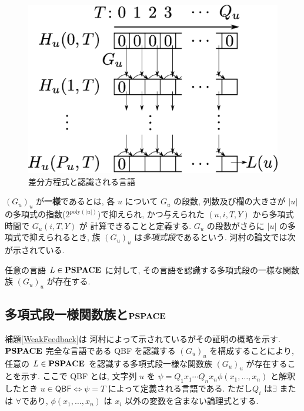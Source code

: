  \begin{figure}
  \label{fig:divp}
  \begin{center}
   \includegraphics[height=0.2\textheight]{image/divp.eps}
  \end{center}
  \caption{差分方程式と認識される言語}
 \end{figure}

$(G_u)_u$ が{\bf 一様}であるとは,
各 $u$ について $G _u$ の段数, 列数及び欄の大きさが $|u|$ の多項式の指数($2^{\mathrm{poly} (|u|)}$)で抑えられ, 
かつ与えられた $(u, i, T, Y)$ から多項式時間で $G_u(i, T, Y)$ が
計算できることと定義する.
$G_u$ の段数がさらに $|u|$ の多項式で抑えられるとき, 
族 $(G_u) _u$ は\emph{多項式段}であるという. 
河村の論文では次が示されている.

 \begin{lemma}
  \label{WeakFeedback}
  任意の言語 $L \in \mathbf{PSPACE}$ に対して,
  その言語を認識する多項式段の一様な関数族 $(G_u)_u$ が存在する.
 \end{lemma}


\subsection{多項式段一様関数族と$\mathbf{PSPACE}$}


補題\ref{WeakFeedback}は
河村によって示されているがその証明の概略を示す.
$\mathbf{PSPACE}$ 完全な言語である
\textsf{QBF} を認識する $(G_u)_u$ を構成することにより,
任意の $L \in \mathbf{PSPACE}$ を認識する多項式段一様な関数族 $(G_u)_u$ が存在することを示す.
ここで \textsf{QBF} とは,
文字列 $u$ を $\psi = Q_1 x_1 \cdots Q_n x_n \phi(x_1, \dots, x_n)$ と解釈したとき 
$u \in \textsf{QBF} \Leftrightarrow \psi = T$ によって定義される言語である. 
ただし$Q_i$ は$\exists$ または $\forall$であり,  
$\phi(x_1, \dots, x_n)$ は $x_i$ 以外の変数を含まない論理式とする. 

